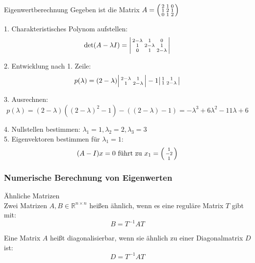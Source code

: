 \begin{example2}{Eigenwertberechnung}
Gegeben ist die Matrix
$A = \begin{psmallmatrix} 
2 & 1 & 0 \\
1 & 2 & 1 \\
0 & 1 & 2
\end{psmallmatrix}$

1. Charakteristisches Polynom aufstellen:
   $$\det(A - \lambda I) = \begin{vsmallmatrix} 
   2-\lambda & 1 & 0 \\
   1 & 2-\lambda & 1 \\
   0 & 1 & 2-\lambda
   \end{vsmallmatrix}$$
   
2. Entwicklung nach 1. Zeile:
   $$p(\lambda) = (2-\lambda)\begin{vsmallmatrix}
   2-\lambda & 1 \\
   1 & 2-\lambda
   \end{vsmallmatrix} - 1\begin{vsmallmatrix}
   1 & 1 \\
   1 & 2-\lambda
   \end{vsmallmatrix}$$
   
3. Ausrechnen:
   $$p(\lambda) = (2-\lambda)((2-\lambda)^2 - 1) - ((2-\lambda) - 1)
   = -\lambda^3 + 6\lambda^2 - 11\lambda + 6$$
   
4. Nullstellen bestimmen:
   $\lambda_1 = 1, \lambda_2 = 2, \lambda_3 = 3$
\vspace{1mm}\\
5. Eigenvektoren bestimmen für $\lambda_1 = 1$:
   $$(A - I)x = 0 \text{ führt zu } x_1 = \begin{psmallmatrix} 1 \\ -2 \\ 1 \end{psmallmatrix}$$
\end{example2}

\subsubsection{Numerische Berechnung von Eigenwerten}

\begin{concept}{Ähnliche Matrizen}\\
Zwei Matrizen $A,B \in \mathbb{R}^{n\times n}$ heißen ähnlich, wenn es eine reguläre Matrix $T$ gibt mit:
$$B = T^{-1}AT$$

Eine Matrix $A$ heißt diagonalisierbar, wenn sie ähnlich zu einer Diagonalmatrix $D$ ist:
$$D = T^{-1}AT$$
\end{concept}

